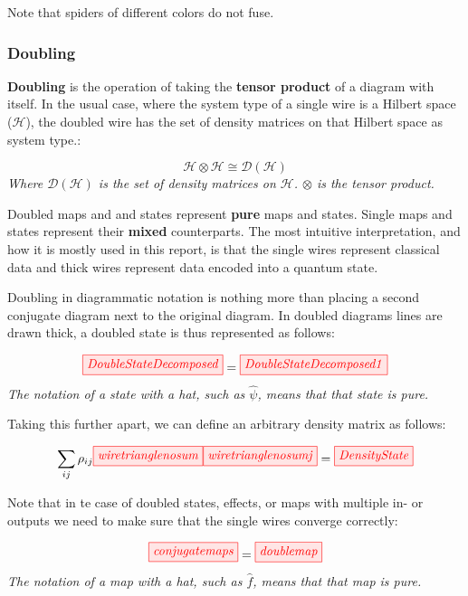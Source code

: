 \documentclass[]{article}
\begin{document}
Note that spiders of different colors do not fuse.

\subsubsection{Doubling}
\label{doubling}

\textbf{Doubling} is the operation of taking the \textbf{tensor product} of a diagram with itself. In the usual case, where the system type of a single wire is a Hilbert space ($\mathcal{H}$), the doubled wire has the set of density matrices on that Hilbert space as system type.:

\begin{equation}
\mathcal{H} \otimes \mathcal{H} \cong \mathcal{D}(\mathcal{H})
\end{equation}
\textit{Where $\mathcal{D}(\mathcal{H})$ is the set of density matrices on $\mathcal{H}$. $\otimes$ is the tensor product.}

Doubled maps and and states represent \textbf{pure} maps and states. Single maps and states represent their \textbf{mixed} counterparts. The most intuitive interpretation, and how it is mostly used in this report, is that the single wires represent classical data and thick wires represent data encoded into a quantum state.

Doubling in diagrammatic notation is nothing more than placing a second conjugate diagram next to the original diagram. In doubled diagrams lines are drawn thick, a doubled state is thus represented as follows:

\begin{equation}
	\label{equation:doubledstate}
	\tikzfig{DoubleStateDecomposed} = \tikzfig{DoubleStateDecomposed1}
\end{equation}
\textit{The notation of a state with a hat, such as $\hat{\psi}$, means that that state is pure.}

Taking this further apart, we can define an arbitrary density matrix as follows:

\begin{equation}
	 \sum\limits_{ij} \rho_{ij} \tikzfig{wiretrianglenosum} \tikzfig{wiretrianglenosumj} = \tikzfig{DensityState}
\end{equation}

Note that in te case of doubled states, effects, or maps with multiple in- or outputs we need to make sure that the single wires converge correctly:

\begin{equation}
\tikzfig{conjugatemaps} = \tikzfig{doublemap}
\end{equation}
\textit{The notation of a map with a hat, such as $\hat{f}$, means that that map is pure.}
\end{document}
